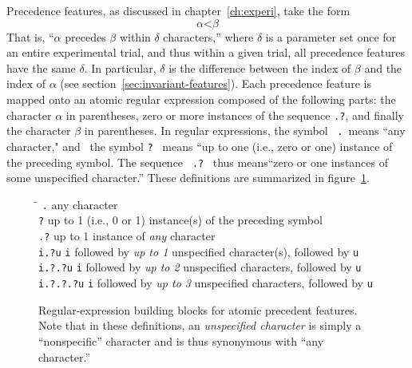 Precedence features, as discussed in chapter~\ref{ch:experi}, take the form
\begin{equation*}
\alpha\text{<}\beta
\end{equation*}
That is, ``$\alpha$ precedes $\beta$ within $\delta$ characters,'' where $\delta$ is 
a parameter set once for an entire experimental trial, and thus within a given trial, all precedence features
have the same $\delta$.  In particular, $\delta$ is the difference between the 
index of $\beta$ and the index of $\alpha$ (see section~\ref{sec:invariant-features}).
Each precedence feature is mapped onto an atomic regular expression composed of the following parts:
the character $\alpha$ in parentheses, zero or more instances of the sequence \texttt{.?},  and finally
the character $\beta$ in parentheses. In regular expressions, the symbol \, \texttt{.} \,means ``any character," and 
\, the symbol \texttt{?} \, means ``up to one (i.e., zero or one) instance of the preceding symbol. The sequence \, \texttt{.?} \, 
thus means``zero or one instances of some unspecified character.'' These definitions are summarized in figure~\ref{fig:regex-defs}.
\begin{figure}[ht]
\begin{mdframed}
\begin{tabbing}
 \hspace{1in}  \=  \hspace{5.5in} \kill
\texttt{.} \> any character\\
\texttt{?} \> up to 1 (i.e., 0 or 1) instance(s) of the preceding symbol \\
\texttt{.?} \> up to 1 instance of \emph{any} character\\
\texttt{i.?u}  \>\texttt{i} followed by \emph{up to 1} unspecified character(s), followed by \texttt{u}\\
\texttt{i.?.?u}  \>\texttt{i} followed by \emph{up to 2} unspecified characters, followed by \texttt{u}\\
\texttt{i.?.?.?u}  \>\texttt{i} followed by \emph{up to 3} unspecified characters, followed by \texttt{u}\\
\end{tabbing}
\label{fig:regex-defs}
\caption{Regular-expression building blocks for atomic precedent features. Note that in these definitions, an \emph{unspecified
character} is simply a ``nonspecific'' character and is thus synonymous with ``any character.'' }
\end{mdframed}
\end{figure}

